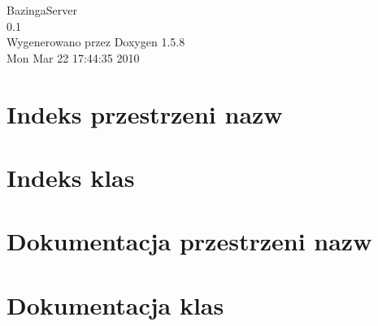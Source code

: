 \documentclass[a4paper]{book}
\begin{document}
\begin{titlepage}
\vspace*{7cm}
\begin{center}
{\Large BazingaServer \\[1ex]\large 0.1 }\\
\vspace*{1cm}
{\large Wygenerowano przez Doxygen 1.5.8}\\
\vspace*{0.5cm}
{\small Mon Mar 22 17:44:35 2010}\\
\end{center}
\end{titlepage}
\clearemptydoublepage
{}
\tableofcontents
\clearemptydoublepage
{}
\chapter{Indeks przestrzeni nazw}

\chapter{Indeks klas}

\chapter{Dokumentacja przestrzeni nazw}



\chapter{Dokumentacja klas}













\printindex
\end{document}
